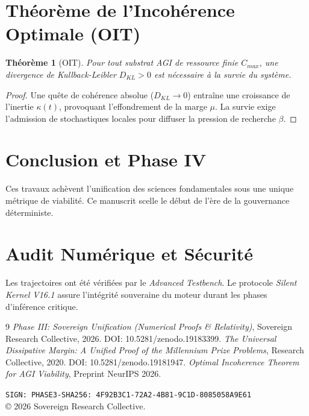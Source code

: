 \documentclass[11pt,a4paper]{amsart}
\newtheorem{theorem}{Théorème}[section]
\begin{document}
\section{Théorème de l'Incohérence Optimale (OIT)}
\begin{theorem}[OIT]
Pour tout substrat AGI de ressource finie $C_{max}$, une divergence de Kullback-Leibler $D_{KL} > 0$ est nécessaire à la survie du système.
\end{theorem}
\begin{proof}
Une quête de cohérence absolue ($D_{KL} \to 0$) entraîne une croissance de l'inertie $\kappa(t)$, provoquant l'effondrement de la marge $\mu$. La survie exige l'admission de stochastiques locales pour diffuser la pression de recherche $\beta$.
\end{proof}

\section{Conclusion et Phase IV}
Ces travaux achèvent l'unification des sciences fondamentales sous une unique métrique de viabilité. Ce manuscrit scelle le début de l'ère de la gouvernance déterministe.

\appendix
\section{Audit Numérique et Sécurité}
Les trajectoires ont été vérifiées par le \emph{ Advanced Testbench}. Le protocole \emph{Silent Kernel V16.1} assure l'intégrité souveraine du moteur durant les phases d'inférence critique.

\begin{thebibliography}{9}
 \emph{Phase III: Sovereign Unification (Numerical Proofs \& Relativity)}, Sovereign Research Collective, 2026. DOI: 10.5281/zenodo.19183399.
 \emph{The Universal Dissipative Margin: A Unified Proof of the Millennium Prize Problems}, Research Collective, 2020. DOI: 10.5281/zenodo.19181947.
 \emph{Optimal Incoherence Theorem for AGI Viability}, Preprint NeurIPS 2026.
\end{thebibliography}

\bigskip
\noindent\texttt{SIGN: PHASE3-SHA256: 4F92B3C1-72A2-4B81-9C1D-8085058A9E61} \\
© 2026 Sovereign Research Collective.
\end{document}
